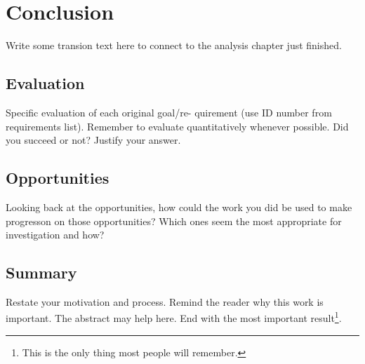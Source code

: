 \chapter{Conclusion}\label{cha:conclusion}
Write some transion text here to connect to the analysis chapter just finished.
\section{Evaluation}
Specific evaluation of each original goal/re-
quirement (use ID number from requirements
list).
Remember to evaluate quantitatively
whenever possible.
Did you succeed or not? Justify your answer.
\section{Opportunities}
Looking back at the opportunities, how could the work you did be used to make progresson on those opportunities?
Which ones seem the most appropriate for investigation and how?
\section{Summary}
Restate your motivation and process.
Remind the reader why this work is important.
The abstract may help here.
End with the most important result\footnote{This is the only thing most people will remember.}.
